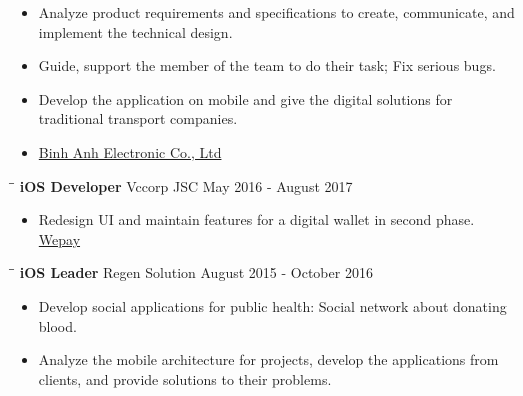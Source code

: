 \documentclass[margin, 10pt]{res}
\begin{document}
\begin{resume}
   \begin{itemize}
		\item Analyze product requirements and specifications to create, communicate, and implement the technical design.
		\item Guide, support the member of the team to do their task; Fix serious bugs.
      \item Develop the application on mobile and give the digital solutions for traditional transport companies.
      \item {\color{blue}\href{https://itunes.apple.com/vn/developer/binh-anh-electronic-co-ltd/id1020602455?l=vi&mt=8}{Binh Anh Electronic Co., Ltd}}
   \end{itemize}

   \begin{tabbing}
   \hspace{2.0in}\= \hspace{2.0in}\= \kill %
   {\bf iOS Developer} \>Vccorp JSC \>May 2016 - August 2017\\
   \end{tabbing}\vspace{-20pt} %

   \begin{itemize}
      \item Redesign UI and maintain features for a digital wallet in second phase. 
      {\color{blue}\href{https://itunes.apple.com/au/app/vi-wepay/id1116328276?mt=8}{Wepay}}    \end{itemize}
   
   \begin{tabbing}
   \hspace{2.0in}\= \hspace{2.0in}\= \kill %
   {\bf iOS Leader} \>Regen Solution \>August 2015 - October 2016\\
   \end{tabbing}\vspace{-20pt} %

   \begin{itemize}
   	\item Develop social applications for public health: Social network about donating blood.
		\item Analyze the mobile architecture for projects, develop the applications 
      from clients, and provide solutions to their problems.
   \end{itemize}


\end{resume}
\end{document}
